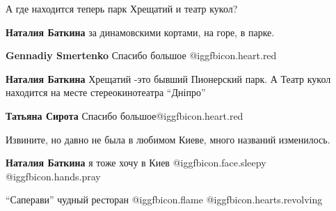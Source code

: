  
 
 
 
 

А где находится теперь парк Хрещатий и театр кукол?

\textbf{Наталия Баткина} за динамовскими кортами, на горе, в парке.

\textbf{Gennadiy Smertenko} Спасибо большое @igg{fbicon.heart.red}

\textbf{Наталия Баткина} Хрещатий -это бывший Пионерский парк.
А Театр кукол находится на месте стереокинотеатра \enquote{Дніпро}

\textbf{Татьяна Сирота} Спасибо большое@igg{fbicon.heart.red}

Извините, но давно не была в любимом Киеве, много названий изменилось.

\textbf{Наталия Баткина} я тоже хочу в Киев @igg{fbicon.face.sleepy}  @igg{fbicon.hands.pray} 

\enquote{Саперави} чудный ресторан  @igg{fbicon.flame}  @igg{fbicon.hearts.revolving} 
